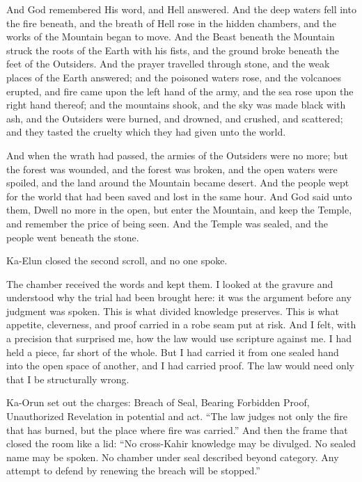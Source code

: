 \begin{scripture}
And God remembered His word, and Hell answered.
And the deep waters fell into the fire beneath, and the breath of Hell rose in the hidden chambers, and the works of the Mountain began to move.
And the Beast beneath the Mountain struck the roots of the Earth with his fists, and the ground broke beneath the feet of the Outsiders.
And the prayer travelled through stone, and the weak places of the Earth answered; and the poisoned waters rose, and the volcanoes erupted, and fire came upon the left hand of the army, and the sea rose upon the right hand thereof; and the mountains shook, and the sky was made black with ash, and the Outsiders were burned, and drowned, and crushed, and scattered; and they tasted the cruelty which they had given unto the world.
\end{scripture}
 
\begin{scripture}
And when the wrath had passed, the armies of the Outsiders were no more; but the forest was wounded, and the forest was broken, and the open waters were spoiled, and the land around the Mountain became desert.
And the people wept for the world that had been saved and lost in the same hour.
And God said unto them, Dwell no more in the open, but enter the Mountain, and keep the Temple, and remember the price of being seen.
And the Temple was sealed, and the people went beneath the stone.
\end{scripture}
 
Ka-Elun closed the second scroll, and no one spoke.\par
 
The chamber received the words and kept them. I looked at the gravure and understood why the trial had been brought here: it was the argument before any judgment was spoken. This is what divided knowledge preserves. This is what appetite, cleverness, and proof carried in a robe seam put at risk. And I felt, with a precision that surprised me, how the law would use scripture against me. I had held a piece, far short of the whole. But I had carried it from one sealed hand into the open space of another, and I had carried proof. The law would need only that I be structurally wrong.\par
 
Ka-Orun set out the charges: Breach of Seal, Bearing Forbidden Proof, Unauthorized Revelation in potential and act. ``The law judges not only the fire that has burned, but the place where fire was carried.'' And then the frame that closed the room like a lid: ``No cross-Kahir knowledge may be divulged. No sealed name may be spoken. No chamber under seal described beyond category. Any attempt to defend by renewing the breach will be stopped.''\par
 
